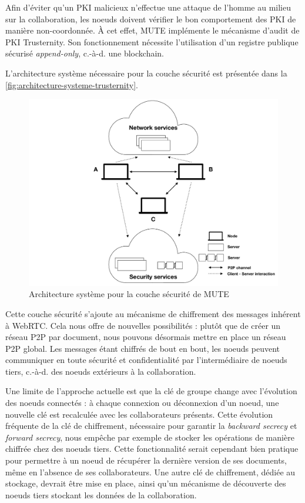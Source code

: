 \documentclass[12pt]{thesul}
\newcommand{\ie}{c.-à-d. }
\begin{document}
Afin d'éviter qu'un \ac{PKI} malicieux n'effectue une attaque de l'homme au milieu sur la collaboration, les noeuds doivent vérifier le bon comportement des PKI de manière non-coordonnée.
À cet effet, MUTE implémente le mécanisme d'audit de PKI Trusternity\cite{2018-trusternity-short, 2018-trusternity-long}.
Son fonctionnement nécessite l'utilisation d'un registre publique sécurisé \emph{append-only}, \ie une blockchain.

L'architecture système nécessaire pour la couche sécurité est présentée dans la \autoref{fig:architecture-systeme-trusternity}.

\begin{figure}[!ht]
  \centering
  \includegraphics[page=4, trim=3cm 1cm 4cm 1cm, clip, width=.7\linewidth]{img/mute-figures.pdf}
  \caption{Architecture système pour la couche sécurité de MUTE}
  \label{fig:architecture-systeme-trusternity}
\end{figure}

Cette couche sécurité s'ajoute au mécanisme de chiffrement des messages inhérent à \ac{WebRTC}.
Cela nous offre de nouvelles possibilités : plutôt que de créer un réseau \ac{P2P} par document, nous pouvons désormais mettre en place un réseau \ac{P2P} global.
Les messages étant chiffrés de bout en bout, les noeuds peuvent communiquer en toute sécurité et confidentialité par l'intermédiaire de noeuds tiers, \ie des noeuds extérieurs à la collaboration.

Une limite de l'approche actuelle est que la clé de groupe change avec l'évolution des noeuds connectés : à chaque connexion ou déconnexion d'un noeud, une nouvelle clé est recalculée avec les collaborateurs présents.
Cette évolution fréquente de la clé de chiffrement, nécessaire pour garantir la \emph{backward secrecy} et \emph{forward secrecy}, nous empêche par exemple de stocker les opérations de manière chiffrée chez des noeuds tiers.
Cette fonctionnalité serait cependant bien pratique pour permettre à un noeud de récupérer la dernière version de ses documents, même en l'absence de ses collaborateurs.
Une autre clé de chiffrement, dédiée au stockage, devrait être mise en place, ainsi qu'un mécanisme de découverte des noeuds tiers stockant les données de la collaboration.
\end{document}
